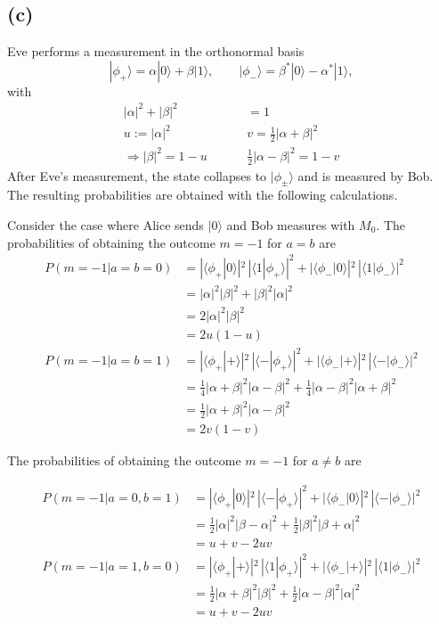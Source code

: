 \documentclass{article}
\begin{document}
\subsection*{(c)}
Eve performs a measurement in the orthonormal basis
\[
|\phi_+\rangle=\alpha|0\rangle+\beta|1\rangle,\qquad
|\phi_-\rangle=\beta^*|0\rangle-\alpha^*|1\rangle,
\]
with
\begin{align}
    |\alpha|^2+|\beta|^2&=1\\
    u:=|\alpha|^2 \hspace{1cm}& v=\frac{1}{2}|\alpha+\beta|^2\\
    \Rightarrow |\beta|^2=1-u \hspace{1cm}& \frac{1}{2}|\alpha-\beta|^2=1-v
\end{align}    
After Eve's measurement, the state collapses to
$|\phi_\pm\rangle$ and is measured by Bob. The resulting
probabilities are obtained with the following calculations.

Consider the case where Alice sends $|0\rangle$ and Bob measures
with $M_0$. The probabilities of obtaining the outcome $m=-1$ for $a=b$ are
\begin{align}
P(m=-1|a=b=0)
&=|\langle\phi_+|0\rangle|^2\,|\langle1|\phi_+\rangle|^2
+|\langle\phi_-|0\rangle|^2\,|\langle1|\phi_-\rangle|^2\\
&=|\alpha|^2|\beta|^2+|\beta|^2|\alpha|^2\\
&=2|\alpha|^2|\beta|^2\\
&=2u(1-u)\\[0.5cm]
P(m=-1|a=b=1)
&=|\langle\phi_+|+\rangle|^2\,|\langle-|\phi_+\rangle|^2
+|\langle\phi_-|+\rangle|^2\,|\langle-|\phi_-\rangle|^2\\
&=\frac{1}{4}|\alpha+\beta|^2|\alpha-\beta|^2+\frac{1}{4}|\alpha-\beta|^2|\alpha+\beta|^2\\
&=\frac{1}{2}|\alpha+\beta|^2|\alpha-\beta|^2\\
&=2v(1-v)
\end{align}

The probabilities of obtaining the outcome $m=-1$ for $a\neq b$ are

\begin{align}
P(m=-1|a=0, b=1)
&=|\langle\phi_+|0\rangle|^2\,|\langle-|\phi_+\rangle|^2
 +|\langle\phi_-|0\rangle|^2\,|\langle-|\phi_-\rangle|^2\\
&=\frac12|\alpha|^2|\beta-\alpha|^2
+\frac12|\beta|^2|\beta+\alpha|^2\\
&=u+v-2uv\\[0.5cm]
P(m=-1|a=1, b=0)
&=|\langle\phi_+|+\rangle|^2\,|\langle1|\phi_+\rangle|^2
 +|\langle\phi_-|+\rangle|^2\,|\langle1|\phi_-\rangle|^2\\
&=\frac12|\alpha+\beta|^2|\beta|^2
+\frac12|\alpha-\beta|^2|\alpha|^2\\
&=u+v-2uv\\
\end{align}
\end{document}

